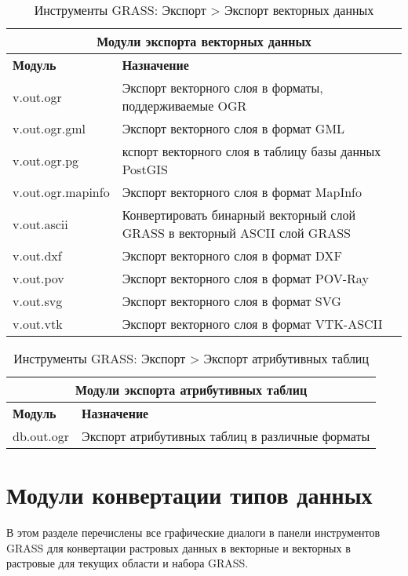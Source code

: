{\renewcommand{\arraystretch}{0.7}
\begin{table}[H]
\centering
 \begin{tabular}{|p{4cm}|p{10cm}|}
  \hline \multicolumn{2}{|c|}{\textbf{Модули экспорта векторных данных}} \\
  \hline \textbf{Модуль} & \textbf{Назначение} \\
  \hline v.out.ogr & Экспорт векторного слоя в форматы, поддерживаемые OGR \\
  \hline v.out.ogr.gml & Экспорт векторного слоя в формат GML \\
  \hline v.out.ogr.pg & кспорт векторного слоя в таблицу базы данных
  PostGIS \\
  \hline v.out.ogr.mapinfo & Экспорт векторного слоя в формат MapInfo \\
  \hline v.out.ascii & Конвертировать бинарный векторный слой GRASS в
  векторный ASCII слой GRASS \\
  \hline v.out.dxf & Экспорт векторного слоя в формат DXF \\
  \hline v.out.pov & Экспорт векторного слоя в формат POV-Ray \\
  \hline v.out.svg & Экспорт векторного слоя в формат SVG \\
  \hline v.out.vtk & Экспорт векторного слоя в формат VTK-ASCII \\
\hline
\end{tabular}
\caption{Инструменты GRASS: Экспорт > Экспорт векторных данных}
\end{table}}

{\renewcommand{\arraystretch}{0.7}
\begin{table}[H]
\centering
 \begin{tabular}{|p{4cm}|p{10cm}|}
  \hline \multicolumn{2}{|c|}{\textbf{Модули экспорта атрибутивных таблиц}} \\
  \hline \textbf{Модуль} & \textbf{Назначение} \\
  \hline db.out.ogr & Экспорт атрибутивных таблиц в различные форматы \\
\hline
\end{tabular}
\caption{Инструменты GRASS: Экспорт > Экспорт атрибутивных таблиц}
\end{table}}


\section{Модули конвертации типов данных}

В этом разделе перечислены все графические диалоги в панели инструментов
GRASS для конвертации растровых данных в векторные и векторных в растровые
для текущих области и набора GRASS.

